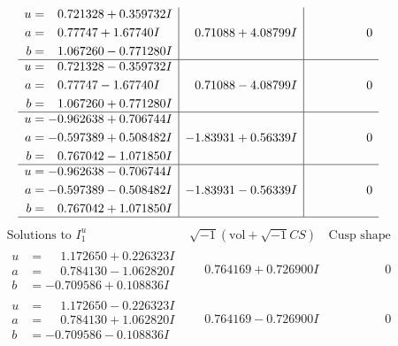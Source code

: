 \documentclass[1p]{elsarticle_modified}
\theoremstyle{definition}
\newcommand{\I}{\sqrt{-1}}
\begin{document}
$$\begin{array}{c|c|c}
\begin{aligned}
u &= \phantom{-}0.721328 + 0.359732 I \\
a &= \phantom{-}0.77747 + 1.67740 I \\
b &= \phantom{-}1.067260 - 0.771280 I\end{aligned}
 & \phantom{-}0.71088 + 4.08799 I & \phantom{-0.000000 } 0 \\ \hline\begin{aligned}
u &= \phantom{-}0.721328 - 0.359732 I \\
a &= \phantom{-}0.77747 - 1.67740 I \\
b &= \phantom{-}1.067260 + 0.771280 I\end{aligned}
 & \phantom{-}0.71088 - 4.08799 I & \phantom{-0.000000 } 0 \\ \hline\begin{aligned}
u &= -0.962638 + 0.706744 I \\
a &= -0.597389 + 0.508482 I \\
b &= \phantom{-}0.767042 - 1.071850 I\end{aligned}
 & -1.83931 + 0.56339 I & \phantom{-0.000000 } 0 \\ \hline\begin{aligned}
u &= -0.962638 - 0.706744 I \\
a &= -0.597389 - 0.508482 I \\
b &= \phantom{-}0.767042 + 1.071850 I\end{aligned}
 & -1.83931 - 0.56339 I & \phantom{-0.000000 } 0\\
 \hline 
 \end{array}$$\newpage$$\begin{array}{c|c|c}  
\text{Solutions to }I^u_{1}& \I (\text{vol} + \sqrt{-1}CS) & \text{Cusp shape}\\
 \hline 
\begin{aligned}
u &= \phantom{-}1.172650 + 0.226323 I \\
a &= \phantom{-}0.784130 - 1.062820 I \\
b &= -0.709586 + 0.108836 I\end{aligned}
 & \phantom{-}0.764169 + 0.726900 I & \phantom{-0.000000 } 0 \\ \hline\begin{aligned}
u &= \phantom{-}1.172650 - 0.226323 I \\
a &= \phantom{-}0.784130 + 1.062820 I \\
b &= -0.709586 - 0.108836 I\end{aligned}
 & \phantom{-}0.764169 - 0.726900 I & \phantom{-0.000000 } 0 \\ \hline\begin{aligned}

\end{aligned}
\end{array}$$
\end{document}
